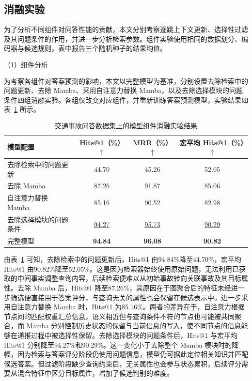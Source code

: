 \subsection{消融实验}

为了分析不同组件对问答性能的贡献，本文分别考察逐跳上下文更新、选择性过滤及其问题条件的作用，并进一步分析检索参数。组件实验使用相同的数据划分、编码器与候选规则，表中报告三个随机种子的结果均值。

\noindent（1）组件分析

为考察各组件对答案预测的影响，本文以完整模型为基准，分别设置去除检索中的问题更新、去除 Mamba、采用自注意力替换 Mamba，以及去除选择模块的问题条件四组消融实验。各组仅改变对应组件，并重新训练答案预测模型，实验结果如表~\ref{tab:ch2-ablation} 所示。

\begin{table}[htbp]
  \centering
  \caption{交通事故问答数据集上的模型组件消融实验结果}
  \label{tab:ch2-ablation}
  \fontsize{10.5bp}{13.65bp}\selectfont
  \begin{tabular*}{\linewidth}{@{\extracolsep{\fill}}lccc@{}}
    \toprule
    模型配置 & Hits@1（\%）$\uparrow$ & MRR（\%）$\uparrow$ & 宏平均 Hits@1（\%）$\uparrow$ \\
    \midrule
    去除检索中的问题更新 & 44.70 & 45.26 & 52.05 \\
    去除 Mamba & 87.26 & 91.87 & 85.06 \\
    自注意力替换 Mamba & 85.16 & 90.52 & 82.98 \\
    去除选择模块的问题条件 & \underline{94.27} & \underline{95.73} & \underline{90.29} \\
    \midrule
    完整模型 & \textbf{94.84} & \textbf{96.08} & \textbf{90.82} \\
    \bottomrule
  \end{tabular*}
\end{table}

由表~\ref{tab:ch2-ablation} 可知，去除检索中的问题更新后，Hits@1 由94.84\%降至44.70\%，宏平均 Hits@1 由90.82\%降至52.05\%。这是因为检索器始终使用原始问题，无法利用已获取的中间事实调整查询内容，后续检索便难以从初始事故转向关联事故及其目标属性。去除 Mamba 后，Hits@1 降至87.26\%，其原因在于图聚合后的特征未经进一步筛选便直接用于答案评分，与查询无关的属性也会保留在候选表示中。进一步采用自注意力替换 Mamba 时，Hits@1 为85.16\%。两者的差异在于，自注意力根据节点间的匹配权重汇总信息，语义相近但与查询条件不符的节点也可能被共同聚合，而 Mamba 分别控制历史状态的保留与当前信息的写入，使不同节点的信息能够在递推过程中被选择性保留。去除选择模块的问题条件后，Hits@1 与宏平均 Hits@1 分别降至94.27\%和90.29\%。这一变化小于去除整个 Mamba 模块时的降幅，因为检索与答案评分阶段仍使用问题信息，模型仍可据此定位相关知识并匹配候选答案。但过滤阶段缺少查询约束后，无关属性也会参与状态累积，后续评分需要从混合特征中区分目标属性，增加了候选判别的难度。

